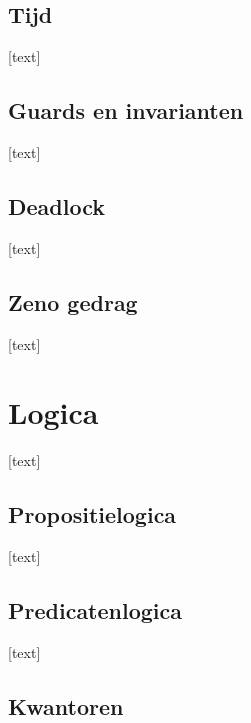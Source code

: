 \documentclass{article}
\begin{document}
		\subsection{Tijd}
		
		[text]
		
		\subsection{Guards en invarianten}
		
		[text]
		
		\subsection{Deadlock}
		
		[text]
		
		\subsection{Zeno gedrag}
		
		[text]
		
	\newpage
	
	
	\section{Logica}
	
	[text]
	
		\subsection{Propositielogica}
		
		[text]
		
		\subsection{Predicatenlogica}
		
		[text]
		
		\subsection{Kwantoren}
		
\end{document}
